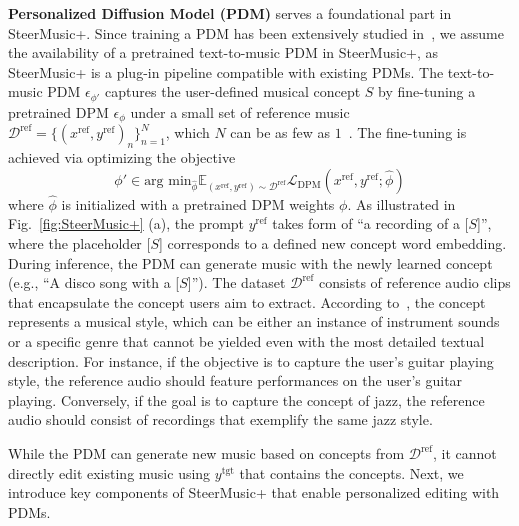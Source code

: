 \textbf{Personalized Diffusion Model (PDM)} serves a foundational part in SteerMusic+.
Since training a PDM has been extensively studied in~\citet{plitsis2024investigating,ruiz2023dreambooth,gal2022image,kumari2023multi}, we assume the availability of a pretrained text-to-music PDM in SteerMusic+, as SteerMusic+ is a plug-in pipeline compatible with existing PDMs.
The text-to-music PDM $\epsilon_{\phi '}$ captures the user-defined musical concept $S$ by fine-tuning a pretrained DPM $\epsilon_{\phi}$ under a small set of reference music $\mathcal{D}^{\text{ref}} = \{(x^{\text{ref}},y^{\text{ref}})_n\}^N_{n=1}$, which $N$ can be as few as $1$~\cite{plitsis2024investigating}. The fine-tuning is achieved via optimizing the objective
\begin{equation}
    \phi ' \in \text{arg min}_{\hat{\phi}}  \mathbb{E}_{(x^{\text{ref}},y^{\text{ref}})\sim\mathcal{D}^{\text{ref}}} \mathcal{L}_{\text{DPM}}(x^{\text{ref}},y^{\text{ref}};\hat \phi) \label{eqn:pdm}
\end{equation}
where $\hat{\phi}$ is initialized with a pretrained DPM weights $\phi$. As illustrated in Fig.~\ref{fig:SteerMusic+} (a), the prompt $y^{\text{ref}}$ takes form of ``a recording of a [$S$]'', where the placeholder [$S$] corresponds to a defined new concept word embedding. During inference, the PDM can generate music with the newly learned concept (e.g., ``A disco song with a [$S$]''). 
The dataset $\mathcal{D}^{\text{ref}}$ consists of reference audio clips that encapsulate the concept users aim to extract. According to~\citet{plitsis2024investigating}, the concept represents a musical style, which can be either an instance of instrument sounds or a specific genre that cannot be yielded even with the most detailed textual description. For instance, if the objective is to capture the user's guitar playing style, the reference audio should feature performances on the user's guitar playing. Conversely, if the goal is to capture the concept of jazz, the reference audio should consist of recordings that exemplify the same jazz style.

While the PDM can generate new music based on concepts from $\mathcal{D}^{\text{ref}}$, it cannot directly edit existing music using $y^\text{tgt}$ that contains the concepts. Next, we introduce key components of SteerMusic+ that enable personalized editing with PDMs.

